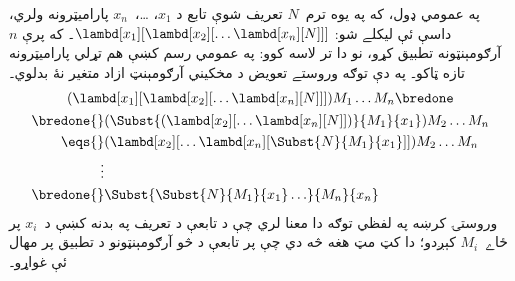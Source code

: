 \documentclass[../../../include/open-logic-section]{subfiles}
\begin{document}
په عمومي ډول، که په يوه ترم~$N$ تعريف شوې تابع د $x_1$، \dots،~$x_n$
پاراميټرونه ولري، داسې ئې ليکلے شو:
$\lambd[x_1][\lambd[x_2][\ldots\lambd[x_n][N]]]$۔ که پرې $n$
آرګومېنټونه تطبيق کړو، نو دا تر لاسه کوو:
په عمومي رسم کښې هم تړلي پاراميټرونه تازه ټاکو۔ په دې توګه وروستے تعويض د مخکيني آرګومېنټ ازاد متغير نۀ بدلوي۔
\begin{multline*}
  (\lambd[x_1][\lambd[x_2][\ldots\lambd[x_n][N]]]) M_1 \dots M_n \bredone\\
  \begin{aligned}
  \bredone {} & (\Subst{(\lambd[x_2][\ldots\lambd[x_n][N]])}{M_1}{x_1}) M_2
  \dots M_n\\
   \eqs {} & (\lambd[x_2][\ldots\lambd[x_n][\Subst{N}{M_1}{x_1}]]) M_2
            \dots M_n \\
  \vdots & \\
  \bredone {} &\Subst{\Subst{N}{M_1}{x_1}\ldots}{M_n}{x_n}
  \end{aligned}
\end{multline*}
وروستۍ کرښه په لفظي توګه دا معنا لري چې د تابعې د تعريف په بدنه کښې
د~$x_i$ پر ځاے~$M_i$ کېږدو؛ دا کټ مټ هغه څه دي چې پر تابعې د څو
آرګومېنټونو د تطبيق پر مهال ئې غواړو۔
\end{document}
